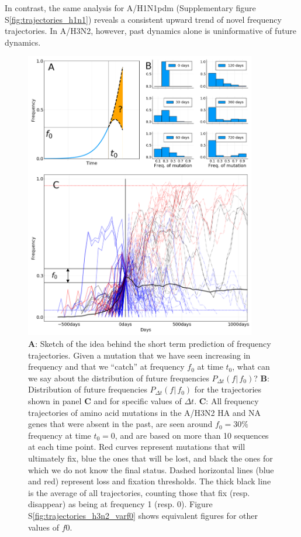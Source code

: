 \documentclass[reprint,amsmath,amssymb,superscriptaddress,showpacs,rmp]{revtex4-1}
\newcommand{\sref}[1]{S\ref{#1}}
\begin{document}
In contrast, the same analysis for A/H1N1pdm (Supplementary figure \sref{fig:trajectories_h1n1}) reveals a consistent upward trend of novel frequency trajectories.
In A/H3N2, however, past dynamics alone is uninformative of future dynamics.

\begin{figure}
	\centering
	\includegraphics[width=0.9\textwidth]{./Figures/Panel1.png}
	\caption{\textbf{A}: Sketch of the idea behind the short term prediction of frequency trajectories. Given a mutation that we have seen increasing in frequency and that we ``catch'' at frequency $f_0$ at time $t_0$, what can we say about the distribution of future frequencies $P_{\Delta t}(f\vert\,f_0)$? \textbf{B}: Distribution of future frequencies $P_{\Delta t}(f\vert\,f_0)$ for the trajectories shown in panel \textbf{C} and for specific values of $\Delta t$. \textbf{C}: All frequency trajectories of amino acid mutations in the A/H3N2 HA and NA genes that were absent in the past, are seen around $f_0=30\%$ frequency at time $t_0=0$, and are based on more than 10 sequences at each time point. Red curves represent mutations that will ultimately fix, blue the ones that will be lost, and black the ones for which we do not know the final status. Dashed horizontal lines (blue and red) represent loss and fixation thresholds. The thick black line is the average of all trajectories, counting those that fix (resp. disappear) as being at frequency 1 (resp. 0). Figure \sref{fig:trajectories_h3n2_varf0} shows equivalent figures for other values of $f0$.}
	\label{fig:trajectories}
\end{figure}
\end{document}
